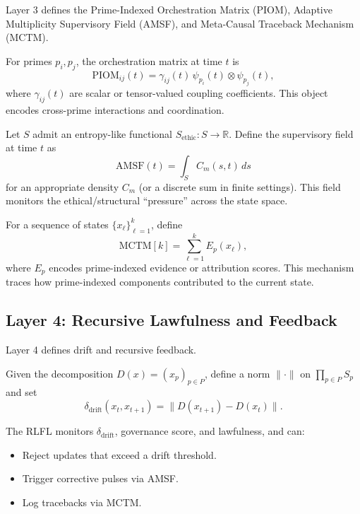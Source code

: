 \documentclass[11pt]{article}
\begin{document}
Layer 3 defines the Prime-Indexed Orchestration Matrix (PIOM), Adaptive Multiplicity Supervisory Field (AMSF), and Meta-Causal Traceback Mechanism (MCTM).

\begin{definition}
For primes \(p_i, p_j\), the orchestration matrix at time \(t\) is
\[
  \mathrm{PIOM}_{ij}(t) = \gamma_{ij}(t) \,\psi_{p_i}(t) \otimes \psi_{p_j}(t),
\]
where \(\gamma_{ij}(t)\) are scalar or tensor-valued coupling coefficients.%
This object encodes cross-prime interactions and coordination.
\end{definition}

\begin{definition}
Let \(S\) admit an entropy-like functional \(S_{\mathrm{ethic}} : S \to \mathbb{R}\).%
Define the supervisory field at time \(t\) as
\[
  \mathrm{AMSF}(t) = \int_S C_m(s, t)\,ds
\]
for an appropriate density \(C_m\) (or a discrete sum in finite settings).%
This field monitors the ethical/structural ``pressure'' across the state space.
\end{definition}

\begin{definition}
For a sequence of states \(\{x_\ell\}_{\ell=1}^k\), define
\[
  \mathrm{MCTM}[k] = \sum_{\ell=1}^k E_p(x_\ell),
\]
where \(E_p\) encodes prime-indexed evidence or attribution scores.%
This mechanism traces how prime-indexed components contributed to the current state.
\end{definition}

\subsection{Layer 4: Recursive Lawfulness and Feedback}

Layer 4 defines drift and recursive feedback.

\begin{definition}[Drift]
Given the decomposition \(D(x) = (x_p)_{p \in P}\), define a norm \(\|\cdot\|\) on \(\prod_{p \in P} S_p\) and set
\[
  \delta_{\mathrm{drift}}(x_t, x_{t+1}) = \bigl\| D(x_{t+1}) - D(x_t) \bigr\|.
\]
\end{definition}

\begin{definition}
The RLFL monitors \(\delta_{\mathrm{drift}}\), governance score, and lawfulness, and can:
\begin{itemize}
  \item Reject updates that exceed a drift threshold.
  \item Trigger corrective pulses via AMSF.
  \item Log tracebacks via MCTM.
\end{itemize}
\end{definition}
\end{document}
